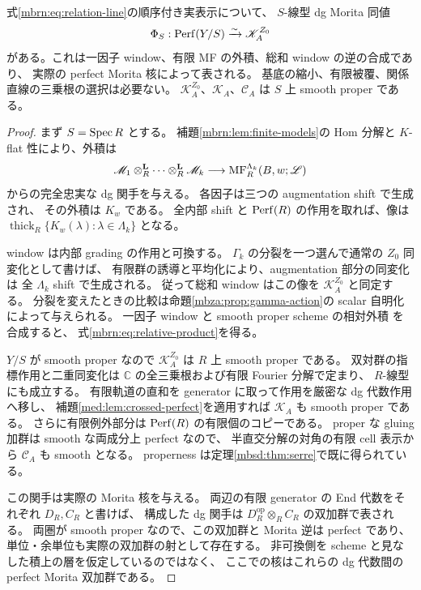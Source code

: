 \begin{theorem}[実表示上の相対非可換積比較]
\label{mbrn:thm:relative-product}
式\eqref{mbrn:eq:relation-line}の順序付き実表示について、
$S$-線型 dg Morita 同値
\begin{equation}\label{mbrn:eq:relative-product}
 \Phi_S:\operatorname{Perf}(Y/S)\xrightarrow{\sim}\mathscr K_A^{Z_0}
\end{equation}
がある。これは一因子 window、有限 MF の外積、総和 window の逆の合成であり、
実際の perfect Morita 核によって表される。
基底の縮小、有限被覆、関係直線の三乗根の選択は必要ない。
$\mathscr K_A^{Z_0}$、$\mathscr K_A$、$\mathscr C_A$ は $S$ 上 smooth proper である。
\end{theorem}
\begin{proof}
まず $S=\operatorname{Spec} R$ とする。
補題\ref{mbrn:lem:finite-models}の Hom 分解と $K$-flat 性により、外積は
\[
 \mathscr M_1\otimes_R^{\mathbf L}\cdots\otimes_R^{\mathbf L}\mathscr M_k
       \longrightarrow\operatorname{MF}^{\Lambda_k}_R(B,w;\mathscr L)
\]
からの完全忠実な dg 関手を与える。
各因子は三つの augmentation shift で生成され、
その外積は $K_w$ である。
全内部 shift と $\operatorname{Perf}(R)$ の作用を取れば、像は
$\operatorname{thick}_R\{K_w(\lambda):\lambda\in\Lambda_k\}$ となる。

window は内部 grading の作用と可換する。
$\Gamma_k$ の分裂を一つ選んで通常の $Z_0$ 同変化として書けば、
有限群の誘導と平均化により、augmentation 部分の同変化は
全 $\Lambda_k$ shift で生成される。
従って総和 window はこの像を $\mathscr K_A^{Z_0}$ と同定する。
分裂を変えたときの比較は命題\ref{mbza:prop:gamma-action}の
scalar 自明化によって与えられる。
一因子 window と smooth proper scheme の相対外積
\cite[Section~8.3, Lemma~8.11, Theorem~8.15]{MBRPToenMorita}を合成すると、
式\eqref{mbrn:eq:relative-product}を得る。

$Y/S$ が smooth proper なので $\mathscr K_A^{Z_0}$ は $R$ 上 smooth proper である。
双対群の指標作用と二重同変化は $\mathbb C$ の全三乗根および有限 Fourier 分解で定まり、
$R$-線型にも成立する\cite[Theorem~4.2, Section~8]{MEDElagin}。
有限軌道の直和を generator に取って作用を厳密な dg 代数作用へ移し、
補題\ref{med:lem:crossed-perfect}を適用すれば $\mathscr K_A$ も smooth proper である。
さらに有限例外部分は $\operatorname{Perf}(R)$ の有限個のコピーである。
proper な gluing 加群は smooth な両成分上 perfect なので、
半直交分解の対角の有限 cell 表示から $\mathscr C_A$ も smooth となる。
properness は定理\ref{mbsd:thm:serre}で既に得られている。

この関手は実際の Morita 核を与える。
両辺の有限 generator の End 代数をそれぞれ $D_R,C_R$ と書けば、
構成した dg 関手は $D_R^{\mathrm{op}}\otimes_RC_R$ の双加群で表される。
両圏が smooth proper なので、この双加群と Morita 逆は perfect であり、
単位・余単位も実際の双加群の射として存在する。
非可換側を scheme と見なした積上の層を仮定しているのではなく、
ここでの核はこれらの dg 代数間の perfect Morita 双加群である。


\end{proof}
